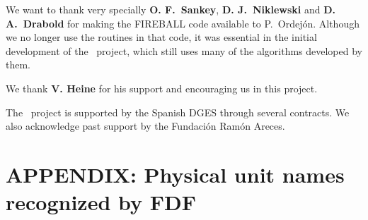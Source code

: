 We want to thank very specially \textbf{O. F.\ Sankey}, \textbf{D. J.\
    Niklewski} and \textbf{D. A.\ Drabold} for making the FIREBALL
code available to P.\ Ordej\'on.  Although we no longer use the
routines in that code, it was essential in the initial development of
the \siesta\ project, which still uses many of the algorithms
developed by them.

We thank \textbf{V. Heine} for his support and encouraging us in this
project.

The \siesta\ project is supported by the Spanish DGES through
several contracts. We also acknowledge past support by the Fundaci\'on
Ram\'on Areces.



\section{APPENDIX: Physical unit names recognized by FDF}

